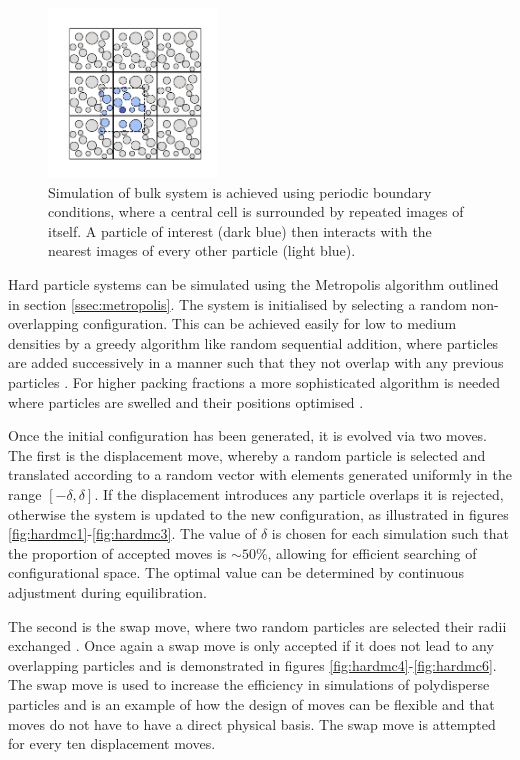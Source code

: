 \begin{figure}[bt]
	\vspace{5mm}
	\includegraphics[width=4.5cm]{./figures/methods/mc_move_g.pdf}
	\caption{Simulation of bulk system is achieved using periodic boundary conditions, where a central cell is surrounded by repeated images of itself. A particle of interest (dark blue) then interacts with the nearest images of every other particle (light blue).}
	\label{fig:pbc}     
\end{figure}

Hard particle systems can be simulated using the Metropolis algorithm outlined in section \ref{ssec:metropolis}.
The system is initialised by selecting a random non\--overlapping configuration.
This can be achieved easily for low to medium densities by a greedy algorithm like random sequential addition, where particles are added successively in a manner such that they not overlap with any previous particles \cite{Widom1966}.
For higher packing fractions a more sophisticated algorithm is needed where particles are swelled and their positions optimised \cite{Woodcock1976}.

Once the initial configuration has been generated, it is evolved via two \mc{} moves.
The first is the displacement move, whereby a random particle is selected and translated according to a random vector with elements generated uniformly in the range $\left[-\delta,\delta\right]$.
If the displacement introduces any particle overlaps it is rejected, otherwise the system is updated to the new configuration, as illustrated in figures \ref{fig:hardmc1}\--\ref{fig:hardmc3}.
The value of $\delta$ is chosen for each simulation such that the proportion of accepted moves is $\sim 50\%$, allowing for efficient searching of configurational space.
The optimal value can be determined by continuous adjustment during equilibration.

The second is the swap move, where two random particles are selected their radii exchanged \cite{Grigera2001,Ninarello2017}. 
Once again a swap move is only accepted if it does not lead to any overlapping particles and is demonstrated in figures \ref{fig:hardmc4}\--\ref{fig:hardmc6}.
The swap move is used to increase the efficiency in simulations of polydisperse particles and is an example of how the design of \mc{} moves can be flexible and that moves do not have to have a direct physical basis. 
The swap move is attempted for every ten displacement moves. 

